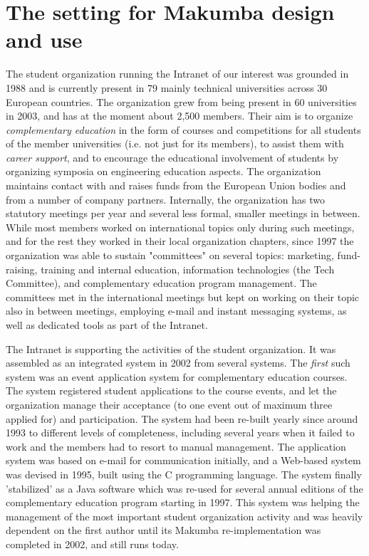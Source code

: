 \documentclass{llncs}
\begin{document}
\section{The setting for Makumba design and use}\label{sec:setting}
The student organization running the Intranet of our interest was grounded in 1988 and is currently present in 79 mainly technical universities across 30 European countries. The organization grew from being present in 60 universities in 2003, and has at the moment about 2,500 members. Their aim is to organize {\it complementary education} in the form of courses and competitions for all students of the member universities (i.e. not just for its members), to assist them with {\it career support}, and to encourage the educational involvement of students by organizing symposia on engineering education aspects.
The organization maintains contact with and raises funds from the European Union bodies and from a number of company partners. Internally, the organization has two statutory meetings per year and several less formal, smaller meetings in between. While most members worked on international topics only during such meetings, and for the rest they worked in their local organization chapters, since 1997 the organization was able to sustain "committees" on several topics: marketing, fund-raising, training and internal education, information technologies (the Tech Committee), and complementary education program management. The committees met in the international meetings but kept on working on their topic also in between meetings, employing e-mail and instant messaging systems, as well as dedicated tools as part of the Intranet.

The Intranet is supporting the activities of the student organization. It was assembled as an integrated system in 2002 from several systems. The {\it first} such system was an event application system for complementary education courses. The system registered student applications to the course events, and let the organization manage their acceptance (to one event out of maximum three applied for) and participation. The system had been re-built yearly since around 1993 to different levels of completeness, including several years when it failed to work and the members had to resort to manual management. The application system was based on e-mail for communication initially, and a Web-based system was devised in 1995, built using the C programming language. The system finally 'stabilized' as a Java software which was re-used for several annual editions of the complementary education program starting in 1997. This system was helping the management of the most important student organization activity and was heavily dependent on the first author until its Makumba re-implementation was completed in 2002, and still runs today.
\end{document}
